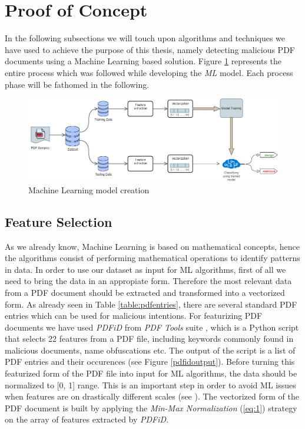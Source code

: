 \section{Proof of Concept}
\label{section:poc}

In the following subsections we will touch upon algorithms and techniques we have used to achieve the purpose of this thesis, namely detecting malicious PDF documents using a Machine Learning based solution. Figure \ref{mlsteps} represents the entire process which was followed while developing the \textit{ML} model. Each process phase will be fathomed in the following.

\begin{figure}[H]
	\centerline{\includegraphics[scale=0.5]{figures/ml.png}}  
	\caption{Machine Learning model creation}
	\label{mlsteps}
\end{figure}

\subsection{Feature Selection}
\label{subsection:featureSelection}
As we already know, Machine Learning is based on mathematical concepts, hence the algorithms consist of performing mathematical operations to identify patterns in data. In order to use our dataset as input for ML algorithms, first of all we need to bring the data in an appropiate form. Therefore the most relevant data from a PDF document should be extracted and transformed into a vectorized form. As already seen in Table \ref{table:pdfentries}, there are several standard PDF entries which can be used for malicious intentions. For featurizing PDF documents we have used \textit{PDFiD} from \textit{PDF Tools} suite \cite{pdftools}, which is a Python script that selects 22 features from a PDF file, including keywords commonly found in malicious documents, name obfuscations etc. The output of the script is a list of PDF entries and their occurences (see Figure \ref{pdfidoutput}). Before turning this featurized form of the PDF file into input for ML algorithms, the data should be normalized to [0, 1] range. This is an important step in order to avoid ML issues when features are on drastically different scales (see \cite{mlCookbook}). The vectorized form of the PDF document is built by applying the \textit{Min-Max Normalization} (\ref{eq:1}) strategy on the array of features extracted by \textit{PDFiD}.

